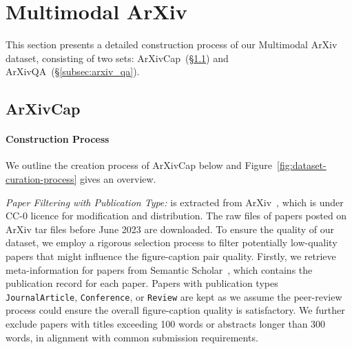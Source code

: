 \section{Multimodal ArXiv}
This section presents a detailed construction process of our Multimodal ArXiv dataset, consisting of two sets: ArXivCap~(\S\ref{subsec:ArXivcap}) and ArXivQA~(\S\ref{subsec:arxiv_qa}).




\subsection{ArXivCap}
\label{subsec:ArXivcap}

\paragraph{Construction Process} We outline the creation process of ArXivCap below and Figure~\ref{fig:dataset-curation-process} gives an overview.

\noindent\emph{Paper Filtering with Publication Type:}
\DatasetName is extracted from ArXiv~\cite{clement2019use}, which is under CC-0 licence for modification and distribution. 
The raw files of papers posted on ArXiv tar files before June 2023 are downloaded. 
To ensure the quality of our dataset, we employ a rigorous selection process to filter potentially low-quality papers that might influence the figure-caption pair quality. 
Firstly, we retrieve meta-information for papers from Semantic Scholar~\cite{kinney2023semantic}, which contains the publication record for each paper. 
Papers with publication types \texttt{JournalArticle},  \texttt{Conference}, or \texttt{Review} are kept as we assume the peer-review process could ensure the overall figure-caption quality is satisfactory.
We further exclude papers with titles exceeding 100 words or abstracts longer than 300 words, in alignment with common submission requirements.


